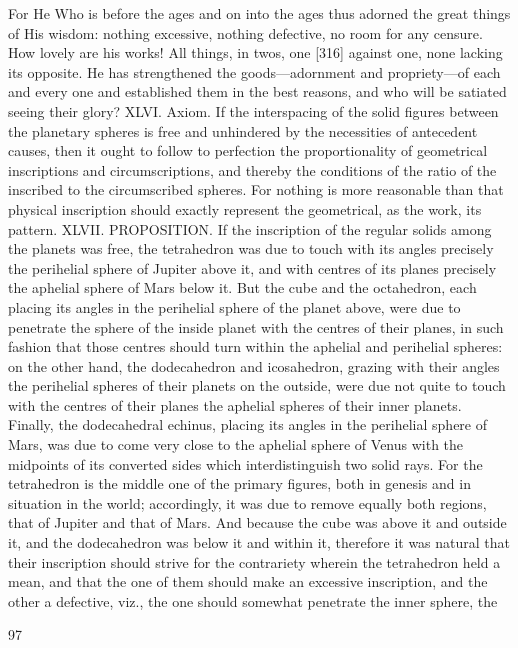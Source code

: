 \documentclass{article}
\begin{document}
For He Who is before the ages and on into the ages thus adorned the
great things of His wisdom: nothing excessive, nothing defective, no
room for any censure. How lovely are his works! All things, in twos,
one [316] against one, none lacking its opposite. He has strengthened the
goods—adornment and propriety—of each and every one and established
them in the best reasons, and who will be satiated seeing their glory?
XLVI. Axiom. If the interspacing of the solid figures between the
planetary spheres is free and unhindered by the necessities of antecedent
causes, then it ought to follow to perfection the proportionality of
geometrical inscriptions and circumscriptions, and thereby the
conditions of the ratio of the inscribed to the circumscribed spheres.
For nothing is more reasonable than that physical inscription should
exactly represent the geometrical, as the work, its pattern.
XLVII. PROPOSITION. If the inscription of the regular solids among the
planets was free, the tetrahedron was due to touch with its angles
precisely the perihelial sphere of Jupiter above it, and with centres of its
planes precisely the aphelial sphere of Mars below it. But the cube and
the octahedron, each placing its angles in the perihelial sphere of the
planet above, were due to penetrate the sphere of the inside planet with
the centres of their planes, in such fashion that those centres should turn
within the aphelial and perihelial spheres: on the other hand, the
dodecahedron and icosahedron, grazing with their angles the perihelial
spheres of their planets on the outside, were due not quite to touch with
the centres of their planes the aphelial spheres of their inner planets.
Finally, the dodecahedral echinus, placing its angles in the perihelial
sphere of Mars, was due to come very close to the aphelial sphere of
Venus with the midpoints of its converted sides which interdistinguish
two solid rays.
For the tetrahedron is the middle one of the primary figures, both in
genesis and in situation in the world; accordingly, it was due to remove
equally both regions, that of Jupiter and that of Mars. And because the
cube was above it and outside it, and the dodecahedron was below it and
within it, therefore it was natural that their inscription should strive for
the contrariety wherein the tetrahedron held a mean, and that the one of
them should make an excessive inscription, and the other a
defective, viz., the one should somewhat penetrate the inner sphere, the


97
\end{document}
